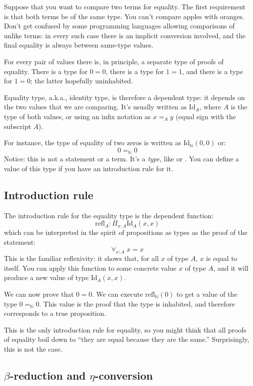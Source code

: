 \documentclass[DaoFP]{subfiles}
\begin{document}
Suppose that you want to compare two terms for equality. The first requirement is that both terms be of the same type. You can't compare apples with oranges. Don't get confused by some programming languages allowing comparisons of unlike terms: in every such case there is an implicit conversion involved, and the final equality is always between same-type values. 

For every pair of values there is, in principle, a separate type of proofs of equality. There is a type for $0 = 0$, there is a type for $1=1$, and there is a type for $1 = 0$; the latter hopefully uninhabited. 

Equality type, a.k.a., identity type, is therefore a dependent type: it depends on the two values that we are comparing. It's usually written as $\text{Id}_A$, where $A$ is the type of both values, or using an infix notation as $x=_A y$ (equal sign with the subscript $A$). 

For instance, the type of equality of two zeros is written as $\text{Id}_{\mathbb{N}} (0, 0)$ or:
\[ 0 =_{\mathbb{N}} 0 \]
Notice: this is not a statement or a term. It's a \emph{type}, like  or . You can define a value of this type if you have an introduction rule for it.

\subsection{Introduction rule}

The introduction rule for the equality type is the dependent function: 
\[ \text{refl}_A \colon \Pi_{x : A}  \text{Id}_A  (x, x)\]
which can be interpreted in the spirit of propositions as types as the proof of the statement:
\[ \forall _{x:A} \;x = x \]
This is the familiar reflexivity: it shows that, for all $x$ of type $A$, $x$ is equal to itself. You can apply this function to some concrete value $x$ of type $A$, and it will produce a new value of type $\text{Id}_A  (x, x)$.

We can now prove that $0=0$. We can execute $\text{refl}_{\mathbb{N}} (0)$ to get a value of the type $0 =_{\mathbb{N}} 0$. This value is the proof that the type is inhabited, and therefore corresponds to a true proposition.

This is the only introduction rule for equality, so you might think that all proofs of equality boil down to ``they are equal because they are the same.'' Surprisingly, this is not the case. 

\subsection{$\beta$-reduction and $\eta$-conversion}
\end{document}
